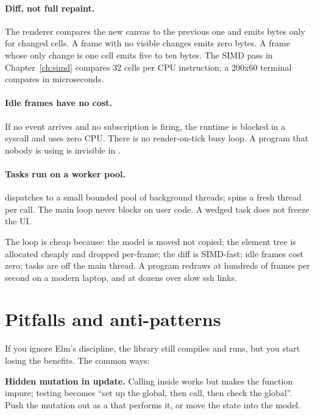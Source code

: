 \paragraph{Diff, not full repaint.} The renderer compares the new
canvas to the previous one and emits bytes only for changed cells.
A frame with no visible changes emits zero bytes. A frame whose only
change is one cell emits five to ten bytes. The SIMD pass in
Chapter~\ref{ch:simd} compares 32 cells per CPU instruction; a 200x60
terminal compares in microseconds.

\paragraph{Idle frames have no cost.} If no event arrives and no
subscription is firing, the runtime is blocked in a 
syscall and uses zero CPU. There is no render-on-tick busy loop. A
\maya{} program that nobody is using is invisible in .

\paragraph{Tasks run on a worker pool.}  dispatches
to a small bounded pool of background threads; 
spins a fresh thread per call. The main loop never blocks on user
code. A wedged task does not freeze the UI.

\begin{recap}
The loop is cheap because: the model is moved not copied; the
element tree is allocated cheaply and dropped per-frame; the diff
is SIMD-fast; idle frames cost zero; tasks are off the main thread.
A \maya{} program redraws at hundreds of frames per second on a
modern laptop, and at dozens over slow ssh links.
\end{recap}

\section{Pitfalls and anti-patterns}
\label{sec:elm:pitfalls}

If you ignore Elm's discipline, the library still compiles and runs,
but you start losing the benefits. The common ways:

\begin{warning}
\textbf{Hidden mutation in update.} Calling
 inside  works but
makes the function impure; testing becomes ``set up the global,
then call, then check the global''. Push the mutation out as a
 that performs it, or move the state into the
model.
\end{warning}

